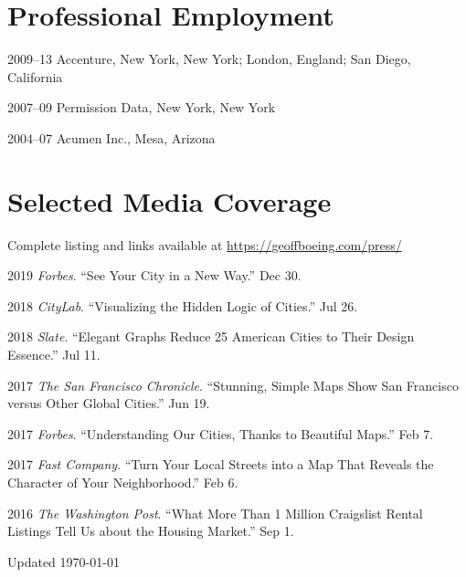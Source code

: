 \documentclass[12pt,letterpaper]{report}
\begin{document}
    \section*{Professional Employment}

    \begin{tablist}

        \item[2009--13] \tab Accenture, New York, New York; London, England; San Diego, California
        \item[2007--09] \tab Permission Data, New York, New York
        \item[2004--07] \tab Acumen Inc., Mesa, Arizona

    \end{tablist}



    \section*{Selected Media Coverage}

    Complete listing and links available at \href{https://geoffboeing.com/press/}{https://geoffboeing.com/press/} \bigskip

    \begin{tablist}

        \item[2019] \tab \textit{Forbes}. \enquote{See Your City in a New Way.} Dec 30.

        \item[2018] \tab \textit{CityLab}. \enquote{Visualizing the Hidden Logic of Cities.} Jul 26.

        \item[2018] \tab \textit{Slate}. \enquote{Elegant Graphs Reduce 25 American Cities to Their Design Essence.} Jul 11.

        \item[2017] \tab \textit{The San Francisco Chronicle}. \enquote{Stunning, Simple Maps Show San Francisco versus Other Global Cities.} Jun 19.

        \item[2017] \tab \textit{Forbes}. \enquote{Understanding Our Cities, Thanks to Beautiful Maps.} Feb 7.

        \item[2017] \tab \textit{Fast Company}. \enquote{Turn Your Local Streets into a Map That Reveals the Character of Your Neighborhood.} Feb 6.

        \item[2016] \tab \textit{The Washington Post}. \enquote{What More Than 1 Million Craigslist Rental Listings Tell Us about the Housing Market.} Sep 1.

    \end{tablist}



    \begin{center}
        \vfill
        Updated \monthyeardate\today
    \end{center}
\end{document}
